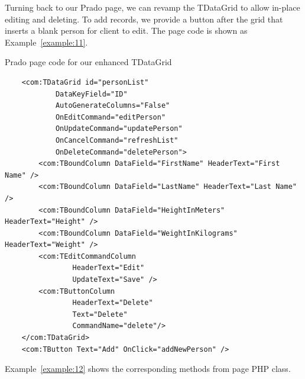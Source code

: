 Turning back to our Prado page, we can revamp the TDataGrid to allow in-place
editing and deleting. To add records, we provide a button after the grid that
inserts a blank person for client to edit. The page code is shown as
Example~\ref{example:11}.
\begin{example}\label{example:11}
Prado page code for our enhanced TDataGrid
\begin{verbatim}
    <com:TDataGrid id="personList"
            DataKeyField="ID"
            AutoGenerateColumns="False"
            OnEditCommand="editPerson"
            OnUpdateCommand="updatePerson"
            OnCancelCommand="refreshList"
            OnDeleteCommand="deletePerson">
        <com:TBoundColumn DataField="FirstName" HeaderText="First Name" />
        <com:TBoundColumn DataField="LastName" HeaderText="Last Name" />
        <com:TBoundColumn DataField="HeightInMeters" HeaderText="Height" />
        <com:TBoundColumn DataField="WeightInKilograms" HeaderText="Weight" />
        <com:TEditCommandColumn
                HeaderText="Edit"
                UpdateText="Save" />
        <com:TButtonColumn
                HeaderText="Delete"
                Text="Delete"
                CommandName="delete"/>
    </com:TDataGrid>
    <com:TButton Text="Add" OnClick="addNewPerson" />
\end{verbatim}
\end{example}

Example~\ref{example:12} shows the corresponding methods from page PHP class.

